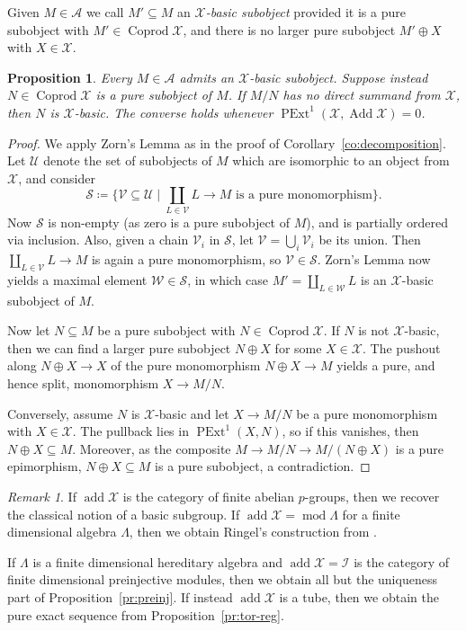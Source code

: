 \documentclass[a4paper]{amsart}
\theoremstyle{plain}
\newtheorem{prop}[thm]{Proposition}
\theoremstyle{definition}
\theoremstyle{remark}
\newtheorem{rem}[thm]{Remark}
\numberwithin{equation}{section}
\newcommand{\add}{\operatorname{add}}
\newcommand{\Add}{\operatorname{Add}}
\newcommand{\Coprod}{\operatorname{Coprod}}
\renewcommand{\mod}{\operatorname{mod}}
\newcommand{\PExt}{\operatorname{PExt}}
\def\A{\mathcal A}
\def\I{\mathcal I}
\def\X{\mathcal X}
\begin{document}
Given $M\in\A$ we call $M'\subseteq M$ an \emph{$\X$-basic subobject} provided it is a pure subobject with $M'\in\Coprod\X$, and there is no larger pure subobject $M'\oplus X$ with $X\in\X$.

\begin{prop}\label{pr:X-basic}
Every $M\in\A$ admits an $\X$-basic subobject. Suppose instead $N\in\Coprod\X$ is a pure subobject of $M$. If $M/N$ has no direct summand from $\X$, then $N$ is $\X$-basic. The converse holds whenever $\PExt^1(\X,\Add\X)=0$.
\end{prop}

\begin{proof}
We apply Zorn's Lemma as in the proof of Corollary~\ref{co:decomposition}. Let $\mathcal U$ denote the set of subobjects of $M$ which are isomorphic to an object from $\X$, and consider
\[ \mathcal S \coloneqq \{ \mathcal V \subseteq\mathcal U \mid \textstyle{\coprod_{L\in\mathcal V}L\to M} \textrm{ is a pure monomorphism} \}. \]
Now $\mathcal S$ is non-empty (as zero is a pure subobject of $M$), and is partially ordered via inclusion. Also, given a chain $\mathcal V_i$ in $\mathcal S$, let $\mathcal V=\bigcup_i\mathcal V_i$ be its union. Then $\coprod_{L\in\mathcal V}L\to M$ is again a pure monomorphism, so $\mathcal V\in\mathcal S$. Zorn's Lemma now yields a maximal element $\mathcal W\in\mathcal S$, in which case $M'=\coprod_{L\in\mathcal W}L$ is an $\X$-basic subobject of $M$.

Now let $N\subseteq M$ be a pure subobject with $N\in\Coprod\X$. If $N$ is not $\X$-basic, then we can find a larger pure subobject $N\oplus X$ for some $X\in\X$. The pushout along $N\oplus X\to X$ of the pure monomorphism $N\oplus X\to M$ yields a pure, and hence split, monomorphism $X\to M/N$.

Conversely, assume $N$ is $\X$-basic and let $X\to M/N$ be a pure monomorphism with $X\in\X$. The pullback lies in $\PExt^1(X,N)$, so if this vanishes, then $N\oplus X\subseteq M$. Moreover, as the composite $M\to M/N\to M/(N\oplus X)$ is a pure epimorphism, $N\oplus X\subseteq M$ is a pure subobject, a contradiction.
\end{proof}

\begin{rem}
If $\add\X$ is the category of finite abelian $p$-groups, then we recover the classical notion of a basic subgroup. If $\add\X=\mod\Lambda$ for a finite dimensional algebra $\Lambda$, then we obtain Ringel's construction from \cite[Theorem 1.G]{Ri1979}. 

If $\Lambda$ is a finite dimensional hereditary algebra and $\add\X=\I$ is the category of finite dimensional preinjective modules, then we obtain all but the uniqueness part of Proposition~\ref{pr:preinj}. If instead $\add\X$ is a tube, then we obtain the pure exact sequence from Proposition~\ref{pr:tor-reg}.
\end{rem}
\end{document}
